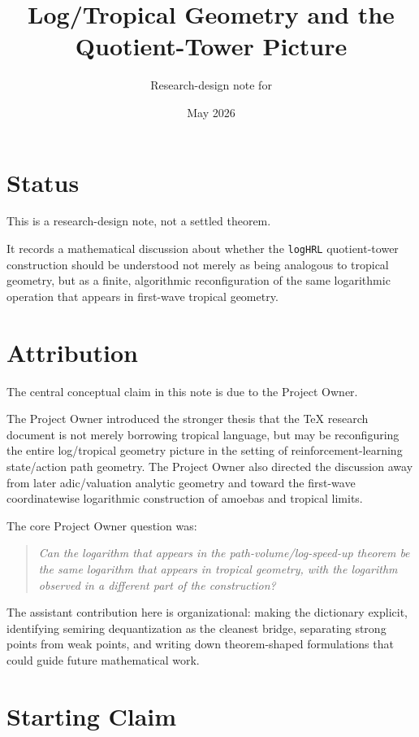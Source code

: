 \documentclass[11pt]{article}
\title{Log/Tropical Geometry and the Quotient-Tower Picture}
\author{Research-design note for \SC}
\date{May 2026}
\newcommand{\logHRL}{\texttt{logHRL}}
\newenvironment{claimbox}
  {\begin{quote}\itshape}
  {\end{quote}}
\begin{document}
\maketitle

\section*{Status}

This is a research-design note, not a settled theorem.

It records a mathematical discussion about whether the \logHRL{}
quotient-tower construction should be understood not merely as being analogous
to tropical geometry, but as a finite, algorithmic reconfiguration of the same
logarithmic operation that appears in first-wave tropical geometry.

\section*{Attribution}

The central conceptual claim in this note is due to the Project Owner.

The Project Owner introduced the stronger thesis that the TeX research document
is not merely borrowing tropical language, but may be reconfiguring the entire
log/tropical geometry picture in the setting of reinforcement-learning
state/action path geometry. The Project Owner also directed the discussion away
from later adic/valuation analytic geometry and toward the first-wave
coordinatewise logarithmic construction of amoebas and tropical limits.

The core Project Owner question was:

\begin{claimbox}
Can the logarithm that appears in the path-volume/log-speed-up theorem be the
same logarithm that appears in tropical geometry, with the logarithm observed in
a different part of the construction?
\end{claimbox}

The assistant contribution here is organizational: making the dictionary
explicit, identifying semiring dequantization as the cleanest bridge, separating
strong points from weak points, and writing down theorem-shaped formulations
that could guide future mathematical work.

\section{Starting Claim}
\end{document}
